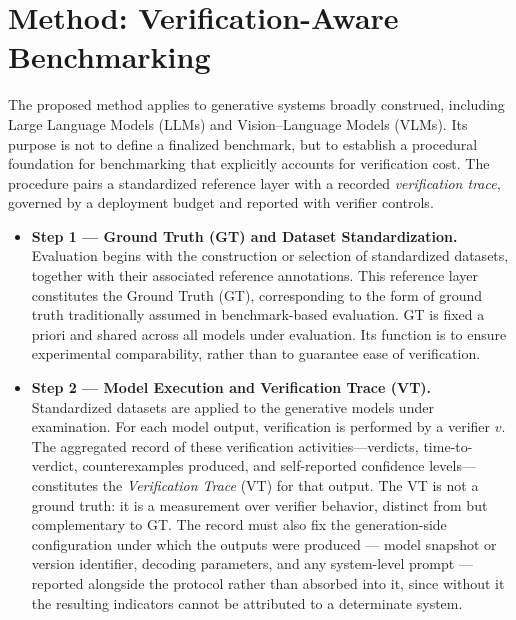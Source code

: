 \documentclass[11pt]{article}
\newcommand{\drift}[1]{\textcolor{cyan!85!black}{#1}}
\newcommand{\drift}[1]{#1}
\begin{document}
\section{Method: Verification-Aware Benchmarking}
\label{sec:method}

{The proposed method applies to generative systems broadly construed, including Large Language Models (LLMs) and Vision–Language Models (VLMs). Its purpose is not to define a finalized benchmark, but to establish a procedural foundation for benchmarking that explicitly accounts for verification cost. The procedure pairs a standardized reference layer with a recorded \textit{verification trace}, governed by a deployment budget and reported with verifier controls.}

\begin{itemize}
    \item \textbf{Step 1 --- Ground Truth (GT) and Dataset Standardization.} {Evaluation begins with the construction or selection of standardized datasets, together with their associated reference annotations. This reference layer constitutes the Ground Truth (GT), corresponding to the form of ground truth traditionally assumed in benchmark-based evaluation. GT is fixed a priori and shared across all models under evaluation. Its function is to ensure experimental comparability, rather than to guarantee ease of verification.}

    \item \textbf{Step 2 --- Model Execution and Verification Trace (VT).} {Standardized datasets are applied to the generative models under examination. For each model output, verification is performed by a verifier $v$. The aggregated record of these verification activities---verdicts, time-to-verdict, counterexamples produced, and self-reported confidence levels---constitutes the \emph{Verification Trace} (VT) for that output. The VT is not a ground truth: it is a measurement over verifier behavior, distinct from but complementary to GT.} \drift{The record must also fix the generation-side configuration under which the outputs were produced --- model snapshot or version identifier, decoding parameters, and any system-level prompt --- reported alongside the protocol rather than absorbed into it, since without it the resulting indicators cannot be attributed to a determinate system.}


\end{itemize}
\end{document}
